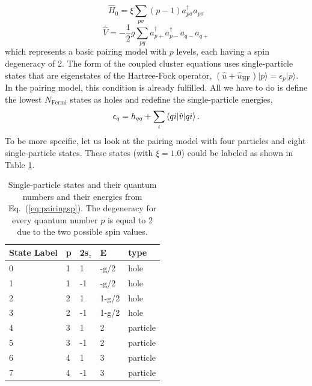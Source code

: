   \begin{equation}
  \hat{H}_0 = \xi \sum_{p \sigma} (p-1) a^{\dagger}_{p \sigma} a_{p
    \sigma}\label{eq:sppairing}
  \end{equation}
  \begin{equation}
  \hat{V} = -\frac{1}{2}g \sum_{pq} a^{\dagger}_{p+}a^{\dagger}_{p-}
  a_{q-}a_{q+}\label{eq:intpairing}
  \end{equation}
  which represents a basic pairing model with $p$ levels, each having a
  spin degeneracy of 2. The form of the coupled cluster equations 
  uses single-particle states that are eigenstates of the
  Hartree-Fock operator, $\left(\hat{u}+\hat{u}_{\text{HF}}\right)\vert
  p\rangle=\epsilon_{p}\vert p\rangle$. In the pairing model, this
  condition is already fulfilled. All we have to do is define the
  lowest $N_{\mathrm{\mathrm{Fermi}}}$ states as holes and  redefine the single-particle
  energies,
  \begin{equation}\label{eq:pairingsp}
  \epsilon_q = h_{qq} + \sum_{i} \braket{qi|\hat{v}|qi}.
  \end{equation}
  To be more specific, let us look at the pairing model with four
  particles and eight single-particle states. These states (with $\xi =1.0$) could be labeled as shown in 
Table \ref{tab:pairingmodelsp}.
\begin{table}
\caption{Single-particle states and their quantum numbers and their energies from Eq.~(\ref{eq:pairingsp}). The degeneracy for every quantum number $p$ is equal to 2 due to the two possible spin values.} \label{tab:pairingmodelsp}
  \begin{center}
      \begin{tabular}{| l | l | l | l | l |}
      \hline State Label & p & 2s$_z$ & E & type\\ \hline 0 & 1 & 1 &
      -g/2 & hole \\ \hline 1 & 1 & -1 & -g/2 & hole \\ \hline 2 & 2 &
      1 & 1-g/2 & hole \\ \hline 3 & 2 & -1 & 1-g/2 & hole \\ \hline 4
      & 3 & 1 & 2 & particle \\ \hline 5 & 3 & -1 & 2 & particle
      \\ \hline 6 & 4 & 1 & 3 & particle \\ \hline 7 & 4 & -1 & 3 &
      particle \\ \hline
      \end{tabular}
  \end{center}
\end{table}
